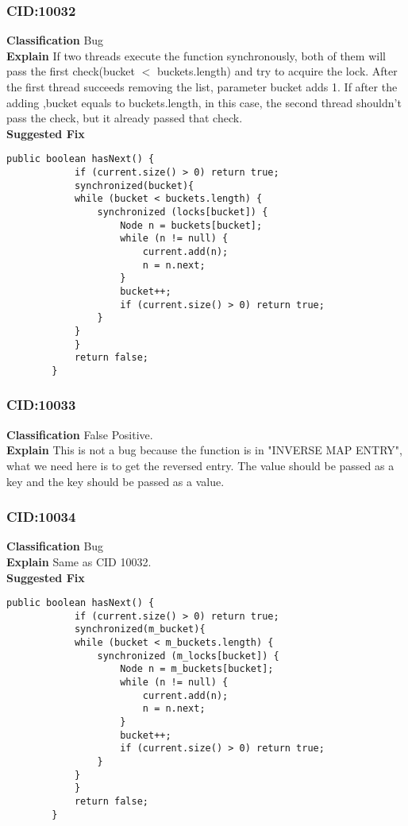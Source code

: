 \documentclass[10pt]{article}
\begin{document}
\subsubsection{CID:10032}
\textbf{Classification}
Bug
\\\textbf{Explain}
If two threads execute the function synchronously, both of them will pass the first check(bucket $<$ buckets.length) and try to acquire the lock. After the first thread succeeds removing the list, parameter bucket adds 1. If after the adding ,bucket equals to buckets.length, in this case, the second thread shouldn't pass the check, but it already passed that check.
\\\textbf{Suggested Fix}
\begin{verbatim}
public boolean hasNext() {
            if (current.size() > 0) return true;
            synchronized(bucket){
            while (bucket < buckets.length) {
                synchronized (locks[bucket]) {
                    Node n = buckets[bucket];
                    while (n != null) {
                        current.add(n);
                        n = n.next;
                    }
                    bucket++;
                    if (current.size() > 0) return true;
                }
            }
            }
            return false;
        }
\end{verbatim}

\subsubsection{CID:10033}
\textbf{Classification}
False Positive.
\\\textbf{Explain}
This is not a bug because the function is in "INVERSE MAP ENTRY", what we need here is to get the reversed entry. The value should be passed as a key and the key should be passed as a value.

\subsubsection{CID:10034}
\textbf{Classification}
Bug
\\\textbf{Explain}
Same as CID 10032.
\\\textbf{Suggested Fix}
\begin{verbatim}
public boolean hasNext() {
            if (current.size() > 0) return true;
            synchronized(m_bucket){
            while (bucket < m_buckets.length) {
                synchronized (m_locks[bucket]) {
                    Node n = m_buckets[bucket];
                    while (n != null) {
                        current.add(n);
                        n = n.next;
                    }
                    bucket++;
                    if (current.size() > 0) return true;
                }
            }
            }
            return false;
        }
\end{verbatim}
\end{document}
